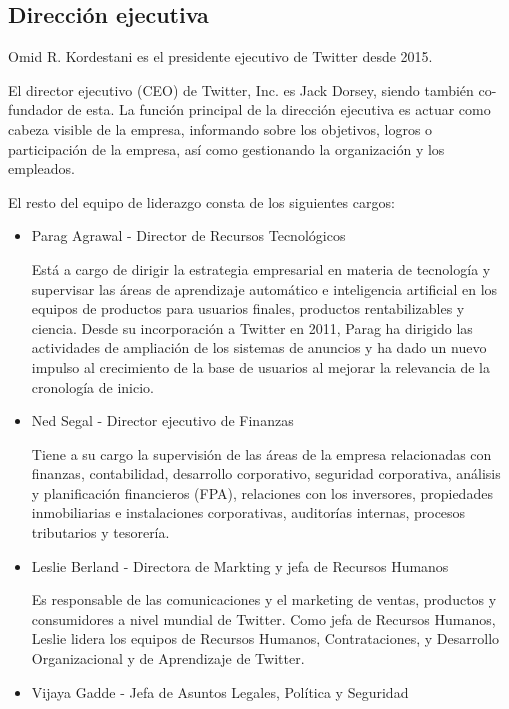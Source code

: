 \subsection{Dirección ejecutiva}

Omid R. Kordestani es el presidente ejecutivo de Twitter desde 2015.

El director ejecutivo (CEO) de Twitter, Inc. es Jack Dorsey, siendo también co-fundador de esta. 
La función principal de la dirección ejecutiva es actuar como cabeza visible de la empresa, informando sobre los objetivos, logros o participación de la empresa, así como gestionando la organización y los empleados.

El resto del equipo de liderazgo consta de los siguientes cargos:

\begin{itemize}

\item Parag Agrawal - Director de Recursos Tecnológicos

Está a cargo de dirigir la estrategia empresarial en materia de tecnología y supervisar las áreas de aprendizaje automático e inteligencia artificial en los equipos de productos para usuarios finales, productos rentabilizables y ciencia. Desde su incorporación a Twitter en 2011, Parag ha dirigido las actividades de ampliación de los sistemas de anuncios y ha dado un nuevo impulso al crecimiento de la base de usuarios al mejorar la relevancia de la cronología de inicio.  

\item Ned Segal - Director ejecutivo de Finanzas

Tiene a su cargo la supervisión de las áreas de la empresa relacionadas con finanzas, contabilidad, desarrollo corporativo, seguridad corporativa, análisis y planificación financieros (FPA), relaciones con los inversores, propiedades inmobiliarias e instalaciones corporativas, auditorías internas, procesos tributarios y tesorería.

\item Leslie Berland - Directora de Markting y jefa de Recursos Humanos

Es responsable de las comunicaciones y el marketing de ventas, productos y consumidores a nivel mundial de Twitter. Como jefa de Recursos Humanos, Leslie lidera los equipos de Recursos Humanos, Contrataciones, y Desarrollo Organizacional y de Aprendizaje de Twitter.

\item Vijaya Gadde - Jefa de Asuntos Legales, Política y Seguridad


\end{itemize}
